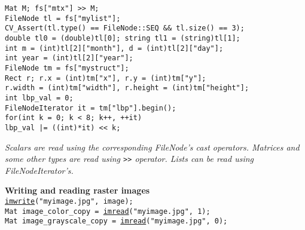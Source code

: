 \documentclass[10pt,landscape]{article}
\begin{document}
\begin{multicols}{3}
\begin{tabbing}
\texttt{Mat M; fs["mtx"] >> M;}\\

\texttt{FileNode tl = fs["mylist"];}\\
\texttt{CV\_Assert(tl.type() == FileNode::SEQ \&\& tl.size() == 3);}\\
\texttt{double tl0 = (double)tl[0]; string tl1 = (string)tl[1];}\\

\texttt{int m = (int)tl[2]["month"], d = (int)tl[2]["day"];}\\
\texttt{int year = (int)tl[2]["year"];}\\

\texttt{FileNode tm = fs["mystruct"];}\\

\texttt{Rect r; r.x = (int)tm["x"], r.y = (int)tm["y"];}\\
\texttt{r.width = (int)tm["width"], r.height = (int)tm["height"];}\\
 
\texttt{int lbp\_val = 0;}\\
\texttt{FileNodeIterator it = tm["lbp"].begin();}\\

\texttt{for(int k = 0; k < 8; k++, ++it)}\\
\>\texttt{lbp\_val |= ((int)*it) << k;}\\
\end{tabbing}

\emph{Scalars are read using the corresponding FileNode's cast operators. Matrices and some other types are read using \texttt{>>} operator. Lists can be read using FileNodeIterator's.}

\begin{tabbing}
\textbf{Wr}\=\textbf{iting and reading raster images}\\
\texttt{\href{http://opencv.willowgarage.com/documentation/cpp/highgui_reading_and_writing_images_and_video.html\#cv-imwrite}{imwrite}("myimage.jpg", image);}\\
\texttt{Mat image\_color\_copy = \href{http://opencv.willowgarage.com/documentation/cpp/highgui_reading_and_writing_images_and_video.html\#cv-imread}{imread}("myimage.jpg", 1);}\\
\texttt{Mat image\_grayscale\_copy = \href{http://opencv.willowgarage.com/documentation/cpp/highgui_reading_and_writing_images_and_video.html\#cv-imread}{imread}("myimage.jpg", 0);}\\
\end{tabbing}


\end{multicols}
\end{document}
